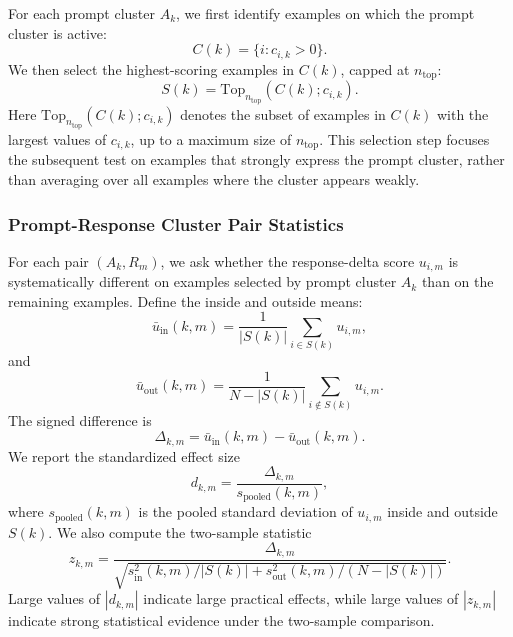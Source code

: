 \documentclass{article} %
\begin{document}
For each prompt cluster $A_k$, we first identify examples on which the prompt cluster is active:
\begin{equation}
C(k) = \{i : c_{i,k} > 0\}.
\end{equation}
We then select the highest-scoring examples in $C(k)$, capped at $n_{\text{top}}$:
\begin{equation}
S(k) = \text{Top}_{n_{\text{top}}}(C(k);c_{i,k}).
\end{equation}
Here $\text{Top}_{n_{\text{top}}}(C(k);c_{i,k})$ denotes the subset of examples in $C(k)$ with the largest values of $c_{i,k}$, up to a maximum size of $n_{\text{top}}$. This selection step focuses the subsequent test on examples that strongly express the prompt cluster, rather than averaging over all examples where the cluster appears weakly.

\subsubsection{Prompt-Response Cluster Pair Statistics}
\label{app:pcfs-pair-statistics}

For each pair $(A_k,R_m)$, we ask whether the response-delta score $u_{i,m}$ is systematically different on examples selected by prompt cluster $A_k$ than on the remaining examples. Define the inside and outside means:
\begin{equation}
\bar u_{\text{in}}(k,m) = \frac{1}{|S(k)|}\sum_{i \in S(k)}u_{i,m},
\end{equation}
and
\begin{equation}
\bar u_{\text{out}}(k,m) = \frac{1}{N-|S(k)|}\sum_{i \notin S(k)}u_{i,m}.
\end{equation}
The signed difference is
\begin{equation}
\Delta_{k,m} = \bar u_{\text{in}}(k,m) - \bar u_{\text{out}}(k,m).
\end{equation}
We report the standardized effect size
\begin{equation}
d_{k,m} = \frac{\Delta_{k,m}}{s_{\text{pooled}}(k,m)},
\end{equation}
where $s_{\text{pooled}}(k,m)$ is the pooled standard deviation of $u_{i,m}$ inside and outside $S(k)$. We also compute the two-sample statistic
\begin{equation}
z_{k,m} = \frac{\Delta_{k,m}}{\sqrt{s^2_{\text{in}}(k,m)/|S(k)| + s^2_{\text{out}}(k,m)/(N-|S(k)|)}}.
\end{equation}
Large values of $|d_{k,m}|$ indicate large practical effects, while large values of $|z_{k,m}|$ indicate strong statistical evidence under the two-sample comparison.
\end{document}
